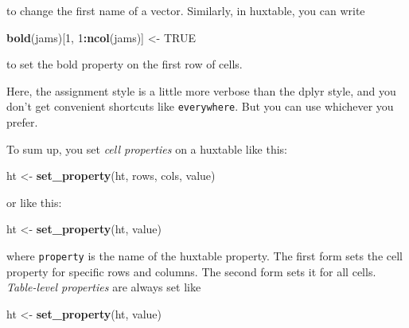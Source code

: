 \documentclass[]{article}
\newenvironment{Shaded}{\begin{snugshade}}{\end{snugshade}}
\newcommand{\DecValTok}[1]{\textcolor[rgb]{0.00,0.00,0.81}{#1}}
\newcommand{\KeywordTok}[1]{\textcolor[rgb]{0.13,0.29,0.53}{\textbf{#1}}}
\newcommand{\NormalTok}[1]{#1}
\newcommand{\OperatorTok}[1]{\textcolor[rgb]{0.81,0.36,0.00}{\textbf{#1}}}
\newcommand{\OtherTok}[1]{\textcolor[rgb]{0.56,0.35,0.01}{#1}}
\newcommand{\StringTok}[1]{\textcolor[rgb]{0.31,0.60,0.02}{#1}}
\begin{document}
\FloatBarrier

to change the first name of a vector. Similarly, in huxtable, you can
write

\begin{Shaded}
\begin{Highlighting}[]
\KeywordTok{bold}\NormalTok{(jams)[}\DecValTok{1}\NormalTok{, }\DecValTok{1}\OperatorTok{:}\KeywordTok{ncol}\NormalTok{(jams)] <-}\StringTok{ }\OtherTok{TRUE}
\end{Highlighting}
\end{Shaded}

\FloatBarrier

to set the bold property on the first row of cells.

Here, the assignment style is a little more verbose than the dplyr
style, and you don't get convenient shortcuts like \texttt{everywhere}.
But you can use whichever you prefer.

To sum up, you set \emph{cell properties} on a huxtable like this:

\begin{Shaded}
\begin{Highlighting}[]
\NormalTok{ht <-}\StringTok{ }\KeywordTok{set_property}\NormalTok{(ht, rows, cols, value)}
\end{Highlighting}
\end{Shaded}

\FloatBarrier

or like this:

\begin{Shaded}
\begin{Highlighting}[]
\NormalTok{ht <-}\StringTok{ }\KeywordTok{set_property}\NormalTok{(ht, value)}
\end{Highlighting}
\end{Shaded}

\FloatBarrier

where \texttt{property} is the name of the huxtable property. The first
form sets the cell property for specific rows and columns. The second
form sets it for all cells. \emph{Table-level properties} are always set
like

\begin{Shaded}
\begin{Highlighting}[]
\NormalTok{ht <-}\StringTok{ }\KeywordTok{set_property}\NormalTok{(ht, value)}
\end{Highlighting}
\end{Shaded}

\FloatBarrier
\end{document}
